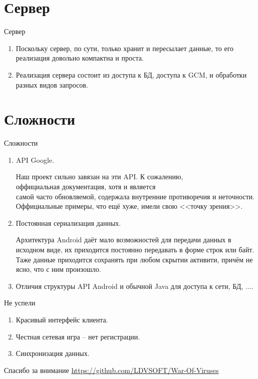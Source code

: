\documentclass{beamer}
\begin{document}
\section{Сервер}

\begin{frame}[t]{Сервер}
		\begin{enumerate}
		\item
			Поскольку сервер, по сути, только хранит и пересылает данные, то его реализация довольно компактна
			и проста.
		\pause
		\item
			Реализация сервера состоит из доступа к БД, доступа к GCM, и обработки разных видов запросов.
		\end{enumerate}
\end{frame}

\section{Сложности}
\begin{frame}[t]{Сложности}
	\begin{enumerate}
			\item API Google.

				Наш проект сильно завязан на эти API. К сожалению, \\оффициальная документация, хотя и является \\самой часто обновляемой, содержала внутренние противоречия и неточности. \\Оффициальные примеры, что ещё хуже, имели свою <<точку зрения>>.
			\pause
			\item Постоянная сериализация данных.

				Архитектура Android даёт мало возможностей для передачи данных в исходном виде, их приходится постоянно передавать в форме строк или байт. Таже данные приходится сохранять при любом скрытии активити, причём не ясно, что с ним произошло.

				\pause
			\item Отличия структуры API Android и обычной Java для доступа к сети, БД, ....
	\end{enumerate}
\end{frame}

\begin{frame}[t]{Не успели}
		\begin{enumerate}
				\item Красивый интерфейс клиента.

				\pause
				\item Честная сетевая игра -- нет регистрации.

				\pause
				\item Синхронизация данных.
		\end{enumerate}
\end{frame}

\begin{frame}[t]{Спасибо за внимание}
	\url{https://github.com/LDVSOFT/War-Of-Viruses}
\end{frame}
\end{document}

